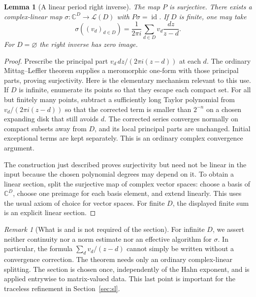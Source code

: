 \documentclass[11pt,letterpaper]{article}
\numberwithin{equation}{section}
\newtheorem{lemma}[theorem]{Lemma}
\theoremstyle{definition}
\theoremstyle{remark}
\newtheorem{remark}[theorem]{Remark}
\newcommand{\C}{\mathbb C}
\newcommand{\LL}{\mathcal L}
\newcommand{\id}{\operatorname{id}}
\begin{document}
\begin{lemma}[A linear period right inverse]\label{lem:period-section}
The map $P$ is surjective. There exists a complex-linear map
$\sigma:\C^D\to\LL(D)$ with $P\sigma=\id$. If $D$ is finite, one may take
\begin{equation}\label{eq:finite-section}
 \sigma((v_d)_{d\in D})=
 \frac1{2\pi i}\sum_{d\in D}v_d\frac{dz}{z-d}.
\end{equation}
For $D=\varnothing$ the right inverse has zero image.
\end{lemma}
\begin{proof}
Prescribe the principal part
$v_d\,dz/(2\pi i(z-d))$ at each $d$. The ordinary Mittag--Leffler theorem
supplies a meromorphic one-form with those principal parts, proving
surjectivity. Here is the elementary mechanism relevant to this use. If
$D$ is infinite, enumerate its points so that they escape each compact set.
For all but finitely many points, subtract a sufficiently long Taylor
polynomial from $v_d/(2\pi i(z-d))$ so that the corrected term is smaller
than $2^{-n}$ on a chosen expanding disk that still avoids $d$. The corrected
series converges normally on compact subsets away from $D$, and its local
principal parts are unchanged. Initial exceptional terms are kept
separately. This is an ordinary complex convergence argument.

The construction just described proves surjectivity but need not be linear
in the input because the chosen polynomial degrees may depend on it. To
obtain a linear section, split the surjective map of complex vector spaces:
choose a basis of $\C^D$, choose one preimage for each basis element, and
extend linearly. This uses the usual axiom of choice for vector spaces.
For finite $D$, the displayed finite sum is an explicit linear section.
\end{proof}

\begin{remark}[What is and is not required of the section]\label{rem:section}
For infinite $D$, we assert neither continuity nor a norm estimate nor an
effective algorithm for $\sigma$. In particular, the formula
$\sum_d v_d/(z-d)$ cannot simply be written without a convergence correction.
The theorem needs only an ordinary complex-linear splitting. The section is
chosen once, independently of the Hahn exponent, and is applied entrywise to
matrix-valued data. This last point is important for the traceless
refinement in Section~\ref{sec:sl}.
\end{remark}
\end{document}
